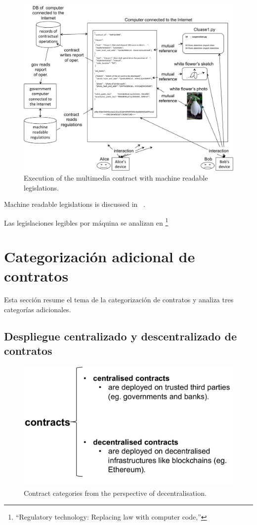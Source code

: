 \documentclass[12pt]{report} %
\begin{document}
\begin{figure}
\centering
\includegraphics[width=0.98\columnwidth]{figures/execontmultireadlegi.pdf}
\caption{Execution of the multimedia contract with machine
         readable legislations.}
\label{fig:execontmultireadlegi}
\end{figure}
 
Machine readable legislations is discussed in ~\cite{Eva2020,Harrop2018}.



Las legislaciones legibles por máquina se analizan en \footnote{\cite{Eva2020}“Regulatory technology: Replacing law with computer
code,”}

\section{Categorización adicional de contratos}

Esta sección resume el tema de la categorización de contratos y analiza tres categorías adicionales.

\subsection{Despliegue centralizado y descentralizado de contratos}
\label{contdeploy}


\begin{figure}
\centering
\includegraphics[width=0.58\columnwidth]{figures/contcatedecentral.pdf}
\caption{Contract categories from the perspective of decentralisation.}
\label{fig:contcatedecentral}
\end{figure}
\end{document}
